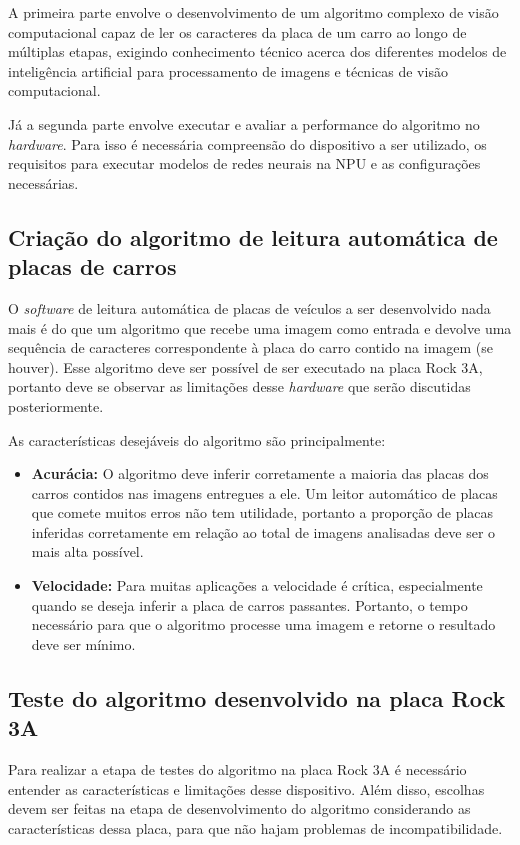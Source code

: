 A primeira parte envolve o desenvolvimento de um algoritmo complexo de visão computacional capaz de ler os caracteres da placa de um carro ao longo de múltiplas etapas, exigindo conhecimento técnico acerca dos diferentes modelos de inteligência artificial para processamento de imagens e técnicas de visão computacional.

Já a segunda parte envolve executar e avaliar a performance do algoritmo no \textit{hardware}. Para isso é necessária compreensão do dispositivo a ser utilizado, os requisitos para executar modelos de redes neurais na NPU e as configurações necessárias.

\subsection{Criação do algoritmo de leitura automática de placas de carros}

O \textit{software} de leitura automática de placas de veículos a ser desenvolvido nada mais é do que um algoritmo que recebe uma imagem como entrada e devolve uma sequência de caracteres correspondente à placa do carro contido na imagem (se houver). Esse algoritmo deve ser possível de ser executado na placa Rock 3A, portanto deve se observar as limitações desse \textit{hardware} que serão discutidas posteriormente.

As características desejáveis do algoritmo são principalmente:

\begin{itemize}
    \item \textbf{Acurácia:} O algoritmo deve inferir corretamente a maioria das placas dos carros contidos nas imagens entregues a ele. Um leitor automático de placas que comete muitos erros não tem utilidade, portanto a proporção de placas inferidas corretamente em relação ao total de imagens analisadas deve ser o mais alta possível.
    \item \textbf{Velocidade:} Para muitas aplicações a velocidade é crítica, especialmente quando se deseja inferir a placa de carros passantes. Portanto, o tempo necessário para que o algoritmo processe uma imagem e retorne o resultado deve ser mínimo.
\end{itemize}

\subsection{Teste do algoritmo desenvolvido na placa Rock 3A}

Para realizar a etapa de testes do algoritmo na placa Rock 3A é necessário entender as características e limitações desse dispositivo. Além disso, escolhas devem ser feitas na etapa de desenvolvimento do algoritmo considerando as características dessa placa, para que não hajam problemas de incompatibilidade.

